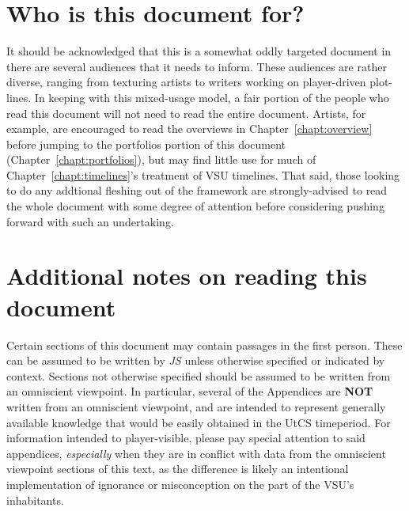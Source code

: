 \section*{Who is this document for?}
It should be acknowledged that this is a somewhat oddly targeted
document in there are several audiences that it needs to inform. These
audiences are rather diverse, ranging from texturing artists to
writers working on player-driven plot-lines. In keeping with this
mixed-usage model, a fair portion of the people who read this document
will not need to read the entire document. Artists, for example, are
encouraged to read the overviews in Chapter~\ref{chapt:overview}
before jumping to the portfolios portion of this document
(Chapter~\ref{chapt:portfolios}), but may find little use for much of
Chapter~\ref{chapt:timelines}'s treatment of VSU timelines. That said,
those looking to do any addtional fleshing out of the framework are
strongly-advised to read the whole document with some degree of
attention before considering pushing forward with such an undertaking.

\section*{Additional notes on reading this document}
Certain sections of this document may contain passages in the first
person. These can be assumed to be written by {\it JS} unless
otherwise specified or indicated by context. Sections not otherwise
specified should be assumed to be written from an omniscient
viewpoint. In particular, several of the Appendices are {\bf NOT}
written from an omniscient viewpoint, and are intended to represent
generally available knowledge that would be easily obtained in the
UtCS timeperiod. For information intended to player-visible, please
pay special attention to said appendices, {\it especially} when they
are in conflict with data from the omniscient viewpoint sections of
this text, as the difference is likely an intentional implementation
of ignorance or misconception on the part of the VSU's inhabitants.


